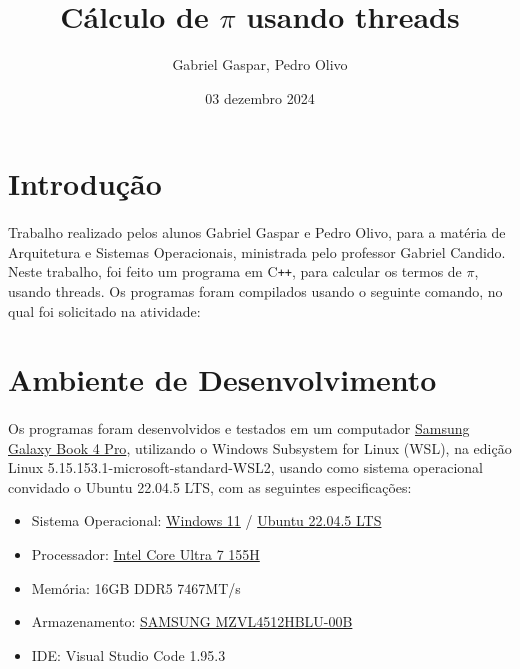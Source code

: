 \documentclass{article}
\title{Cálculo de $\pi$ usando threads}
\author{Gabriel Gaspar, Pedro Olivo}
\date{03 dezembro 2024}
\begin{document}
\maketitle

\section{Introdução}
\paragraph{}Trabalho realizado pelos alunos Gabriel Gaspar e Pedro Olivo, para a matéria de Arquitetura e Sistemas Operacionais, ministrada pelo professor Gabriel Candido. Neste trabalho, foi feito um programa em C\texttt{++}, para calcular os termos de $\pi$, usando threads. Os programas foram compilados usando o seguinte comando, no qual foi solicitado na atividade:



\section{Ambiente de Desenvolvimento}
\paragraph{} Os programas foram desenvolvidos e testados em um computador \href{https://www.samsung.com/br/computers/samsung-book/galaxy-book4-pro-14-inch-ultra-7-16gb-512gb-np940xgk-kg1br/#specs}{Samsung Galaxy Book 4 Pro}, utilizando o Windows Subsystem for Linux (WSL), na edição Linux 5.15.153.1-microsoft-standard-WSL2, usando como sistema operacional convidado o Ubuntu 22.04.5 LTS, com as seguintes especificações:
\begin{itemize}
    \item Sistema Operacional: \href{https://www.microsoft.com/pt-br/windows}{Windows 11} / \href{https://releases.ubuntu.com/jammy/}{Ubuntu 22.04.5 LTS}
    \item Processador: \href{https://www.intel.com.br/content/www/br/pt/products/sku/236847/intel-core-ultra-7-processor-155h-24m-cache-up-to-4-80-ghz/specifications.html}{ Intel Core Ultra 7 155H}
    \item Memória: 16GB DDR5 7467MT/s
    \item Armazenamento: \href{https://www.harddrivebenchmark.net/hdd.php?hdd=SAMSUNG%20MZVL4512HBLU-00B&id=36410}{SAMSUNG MZVL4512HBLU-00B}
    \item IDE: Visual Studio Code 1.95.3
\end{itemize}
\end{document}
